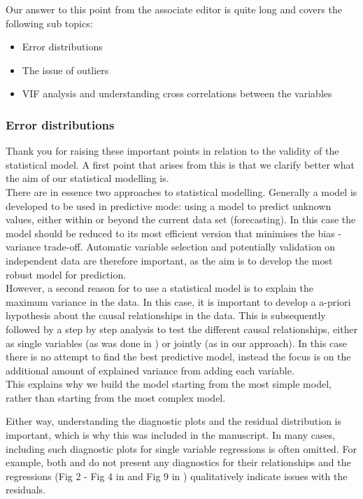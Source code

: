\documentclass[]{elsarticle} %
\providecommand{\tightlist}{%
  \setlength{\itemsep}{0pt}\setlength{\parskip}{0pt}}
\begin{document}
Our answer to this point from the associate editor is quite long and covers the following sub topics:

\begin{itemize}
\tightlist
\item
  Error distributions
\item
  The issue of outliers
\item
  VIF analysis and understanding cross correlations between the variables
\end{itemize}

\hypertarget{error-distributions}{%
\subsubsection{Error distributions}\label{error-distributions}}

Thank you for raising these important points in relation to the validity of the statistical model.
A first point that arises from this is that we clarify better what the aim of our statistical modelling is.\\
There are in essence two approaches to statistical modelling. Generally a model is developed to be used in predictive mode: using a model to predict unknown values, either within or beyond the current data set (forecasting). In this case the model should be reduced to its most efficient version that minimises the bias - variance trade-off. Automatic variable selection and potentially validation on independent data are therefore important, as the aim is to develop the most robust model for prediction.\\
However, a second reason for to use a statistical model is to explain the maximum variance in the data. In this case, it is important to develop a a-priori hypothesis about the causal relationships in the data. This is subsequently followed by a step by step analysis to test the different causal relationships, either as single variables (as was done in \citet{zhang2017}) or jointly (as in our approach). In this case there is no attempt to find the best predictive model, instead the focus is on the additional amount of explained variance from adding each variable.\\
This explains why we build the model starting from the most simple model, rather than starting from the most complex model.

Either way, understanding the diagnostic plots and the residual distribution is important, which is why this was included in the manuscript. In many cases, including such diagnostic plots for single variable regressions is often omitted. For example, both \citet{zhang2017} and \citet{filoso2017} do not present any diagnostics for their relationships and the regressions (Fig 2 - Fig 4 in \citet{zhang2017} and Fig 9 in \citet{filoso2017}) qualitatively indicate issues with the residuals.
\end{document}
